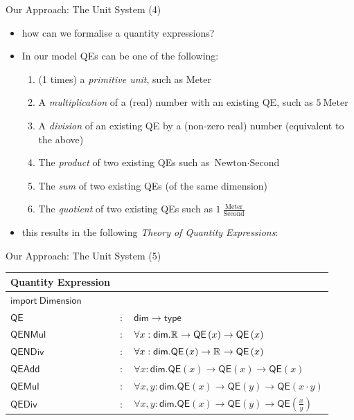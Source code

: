 \documentclass{beamer}
\newcommand{\realnz}{\mathbb{R}^{\*}}
\begin{document}
  \begin{frame}{Our Approach: The Unit System (4)}
    \begin{itemize}[<+->]
      \item how can we formalise a quantity expressions?
      \item In our model QEs can be one of the following:
      \begin{enumerate}
        \item (1 times) a \textit{primitive unit}, such as Meter
        \item A \textit{multiplication} of a (real) number with an existing QE, such as $5\ \text{Meter}$
        \item A \textit{division} of an existing QE by a (non-zero real) number (equivalent to the above)
        \item The \textit{product} of two existing QEs such as $\text{Newton} \cdot{} \text{Second}$
        \item The \textit{sum} of two existing QEs (of the same dimension)
        \item The \textit{quotient} of two existing QEs such as $1\ \frac{\text{Meter}}{\text{Second}}$
      \end{enumerate}
      \item this results in the following \textit{Theory of Quantity Expressions}:
    \end{itemize}
  \end{frame}

  \begin{frame}{Our Approach: The Unit System (5)}
    \begin{center}
      \begin{tabular}{|l l l|}
        \hline
        \textsf{Quantity Expression} & &\\\hline
        $ \mathsf{import \ Dimension}$ &&\\\hline
        $\mathsf{QE}$ & $:$ & $ \mathsf{dim} \rightarrow \mathsf{type}$\\
        $\mathsf{QENMul}$& $:$ & $ \forall x : \mathsf{dim} . \realnz \rightarrow \mathsf{QE}\left( x\right) \rightarrow \mathsf{QE}\left( x\right)$\\
        $\mathsf{QENDiv}$& $:$ & $ \forall x : \mathsf{dim} . \mathsf{QE}\left( x\right) \rightarrow \realnz \rightarrow \mathsf{QE}\left( x\right)$\\

        $\mathsf{QEAdd}$& $:$ & $ \forall x : \mathsf{dim} . \mathsf{QE}\left( x\right) \rightarrow \mathsf{QE}\left( x\right) \rightarrow \mathsf{QE} \left( x \right)  $\\
        $\mathsf{QEMul}$& $:$ & $ \forall x, y : \mathsf{dim} . \mathsf{QE}\left( x\right) \rightarrow \mathsf{QE}\left( y\right) \rightarrow \mathsf{QE} \left( x \cdot{} y \right)  $\\
        $ \mathsf{QEDiv}$& $:$ & $ \forall x, y : \mathsf{dim} . \mathsf{QE}\left( x\right) \rightarrow \mathsf{QE}\left( y\right) \rightarrow \mathsf{QE} \left( \frac{x}{y} \right)  $\\\hline
      \end{tabular}
    \end{center}
  \end{frame}
\end{document}

